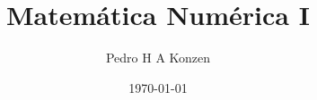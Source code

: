 \documentclass[12pt]{book}
\begin{document}
\frontmatter

\title{Matemática Numérica I}
\author{Pedro H A Konzen}
\date{\today}
\ifishtml
\else
{}
\fi

\maketitle

\nocite{Bjorck1996a,
  Burden2015a,
  Isaacson1994a,
  Lemire2021a,
  Nocedal2006a,
  Press2007a,
  Stoer1993a}




\tableofcontents
{}

\mainmatter

%



% 





\ifisbook

\fi

\nocite{*}


\ifisbook
\clearpage
{}
\printindex
\fi
\end{document}
